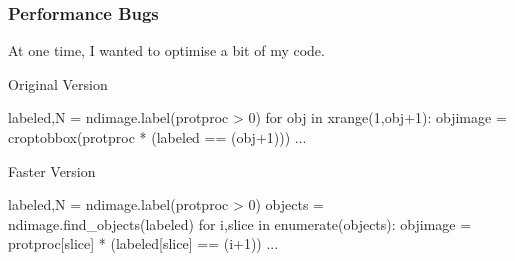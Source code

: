 \begin{frame}[fragile]
\frametitle{Performance Bugs}

At one time, I wanted to optimise a bit of my code.

\end{frame}

\begin{frame}[fragile]

\begin{block}{Original Version}
\begin{python}
labeled,N = ndimage.label(protproc > 0)
for obj in xrange(1,obj+1):
    objimage = croptobbox(protproc * (labeled == (obj+1)))
    ...
\end{python}
\end{block}

\pause
\begin{block}{Faster Version}
\begin{python}
labeled,N = ndimage.label(protproc > 0)
objects = ndimage.find_objects(labeled)
for i,slice in enumerate(objects):
    objimage = protproc[slice] * (labeled[slice] == (i+1))
    ...
\end{python}
\end{block}
\end{frame}



